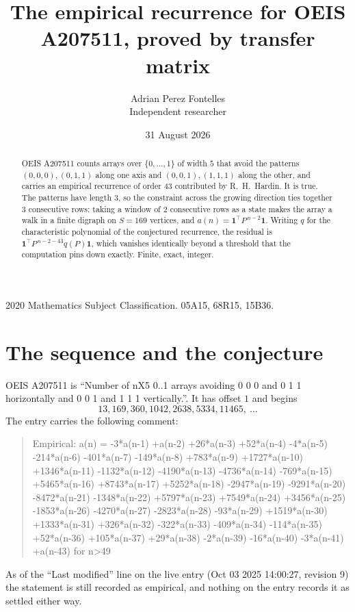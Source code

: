 \documentclass[11pt,a4paper]{article}
\title{The empirical recurrence for OEIS A207511, proved by transfer matrix}
\author{Adrian Perez Fontelles\\ \small Independent researcher}
\date{31 August 2026}
\theoremstyle{plain}
\theoremstyle{definition}
\begin{document}
\maketitle

\begin{abstract}
OEIS A207511 counts arrays over $\{0,\dots,1\}$ of width $5$ that avoid the patterns
$(0,0,0), (0,1,1)$ along one axis and $(0,0,1), (1,1,1)$ along the other, and carries an empirical recurrence of
order $43$ contributed by R.~H.~Hardin. It is true. The patterns have length $3$, so
the constraint across the growing direction ties together $3$ consecutive rows: taking a
window of $2$ consecutive rows as a state makes the array a walk in a finite digraph
on $S=169$ vertices, and $a(n)=\mathbf{1}^{\!\top}P^{\,n-2}\mathbf{1}$. Writing $q$
for the characteristic polynomial of the conjectured recurrence, the residual is
$\mathbf{1}^{\!\top}P^{\,n-2-43}q(P)\mathbf{1}$, which vanishes identically
beyond a threshold that the computation pins down exactly. Finite, exact, integer.
\end{abstract}

\noindent\small 2020 Mathematics Subject Classification. 05A15, 68R15, 15B36.\normalsize

\section{The sequence and the conjecture}

OEIS A207511 is ``Number of nX5 0..1 arrays avoiding 0 0 0 and 0 1 1 horizontally and 0 0 1 and 1 1 1 vertically.''. It has offset
$1$ and begins
\[
13, 169, 360, 1042, 2638, 5334, 11465,\ \dots
\]
The entry carries the following comment:
\begin{quote}\small
Empirical: a(n) = -3*a(n-1) +a(n-2) +26*a(n-3) +52*a(n-4) -4*a(n-5) -214*a(n-6) -401*a(n-7) -149*a(n-8) +783*a(n-9) +1727*a(n-10) +1346*a(n-11) -1132*a(n-12) -4190*a(n-13) -4736*a(n-14) -769*a(n-15) +5465*a(n-16) +8743*a(n-17) +5252*a(n-18) -2947*a(n-19) -9291*a(n-20) -8472*a(n-21) -1348*a(n-22) +5797*a(n-23) +7549*a(n-24) +3456*a(n-25) -1853*a(n-26) -4270*a(n-27) -2823*a(n-28) -93*a(n-29) +1519*a(n-30) +1333*a(n-31) +326*a(n-32) -322*a(n-33) -409*a(n-34) -114*a(n-35) +52*a(n-36) +105*a(n-37) +29*a(n-38) -2*a(n-39) -16*a(n-40) -3*a(n-41) +a(n-43) for n>49
\end{quote}
As of the ``Last modified'' line on the live entry (Oct 03 2025 14:00:27, revision
9) the statement is still recorded as empirical, and nothing on the entry
records it as settled either way.
\end{document}
